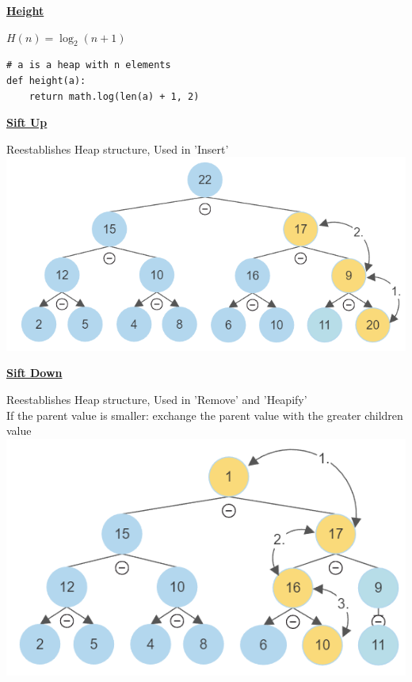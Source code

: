     {\centering\underline{\textbf{Height}} \par}
        $H(n) = \log_2(n+1)$
        \begin{lstlisting}
# a is a heap with n elements
def height(a):
    return math.log(len(a) + 1, 2)
        \end{lstlisting}

    {\centering\underline{\textbf{Sift Up}} \par}
        Reestablishes Heap structure, Used in 'Insert'
        \includegraphics[width = \linewidth]{src/4_data_structure/images/heap_sift_up.png}
        

    {\centering\underline{\textbf{Sift Down}} \par}
        Reestablishes Heap structure, Used in 'Remove' and 'Heapify'\\
        If the parent value is smaller: exchange the parent value with the greater children value
        \includegraphics[width = \linewidth]{src/4_data_structure/images/heap_sift_down.png}
        

